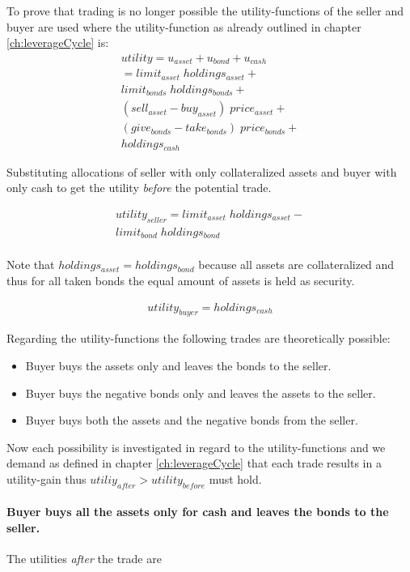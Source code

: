 \documentclass[Bachelorarbeit.tex]{subfiles}
\begin{document}
To prove that trading is no longer possible the utility-functions of the seller and buyer are used where the utility-function as already outlined in chapter \ref{ch:leverageCycle} is:
\begin{align*}
	utility = u_{asset} + u_{bond} + u_{cash}
	\\ = limit_{asset} \; holdings_{asset} + \\
			limit_{bonds} \; holdings_{bonds} + \\
			(sell_{asset} - buy_{asset}) \; price_{asset} + \\
			(give_{bonds} - take_{bonds}) \; price_{bonds} + \\
			holdings_{cash} 
\end{align*}

Substituting allocations of seller with only collateralized assets and buyer with only cash to get the utility \textit{before} the potential trade.

\begin{align*}
	utility_{seller} = limit_{asset} \; holdings_{asset} - \\
			limit_{bond} \; holdings_{bond} \\
\end{align*}

Note that $holdings_{asset} = holdings_{bond}$ because all assets are collateralized and thus for all taken bonds the equal amount of assets is held as security.

\begin{align*}
	utility_{buyer} = holdings_{cash} 
\end{align*}

Regarding the utility-functions the following trades are theoretically possible:
\begin{itemize}
\item Buyer buys the assets only and leaves the bonds to the seller.
\item Buyer buys the negative bonds only and leaves the assets to the seller.
\item Buyer buys both the assets and the negative bonds from the seller.
\end{itemize}

Now each possibility is investigated in regard to the utility-functions and we demand as defined in chapter \ref{ch:leverageCycle} that each trade results in a utility-gain thus $utiliy_{after} > utility_{before}$ must hold.

\paragraph{Buyer buys all the assets only for cash and leaves the bonds to the seller.}
The utilities \textit{after} the trade are
\end{document}
